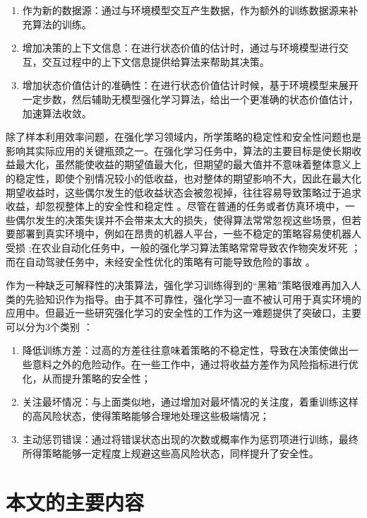 \begin{enumerate}
    \item 作为新的数据源：通过与环境模型交互产生数据，作为额外的训练数据源来补充算法的训练。
    \item 增加决策的上下文信息：在进行状态价值的估计时，通过与环境模型进行交互，交互过程中的上下文信息提供给算法来帮助其决策。
    \item 增加状态价值估计的准确性：在进行状态价值估计时候，基于环境模型来展开一定步数，然后辅助无模型强化学习算法，给出一个更准确的状态价值估计，加速算法收敛。
\end{enumerate}

除了样本利用效率问题，在强化学习领域内，所学策略的稳定性和安全性问题也是影响其实际应用的关键瓶颈之一\cite{junges2016safety}。在强化学习任务中，算法的主要目标是使长期收益最大化，虽然能使收益的期望值最大化，但期望的最大值并不意味着整体意义上的稳定性，即使个别情况较小的低收益，也对整体的期望影响不大，因此在最大化期望收益时，这些偶尔发生的低收益状态会被忽视掉，往往容易导致策略过于追求收益，却忽视整体上的安全性和稳定性 \cite{garcia2015comprehensive}。尽管在普通的任务或者仿真环境中，一些偶尔发生的决策失误并不会带来太大的损失，使得算法常常忽视这些场景，但若要部署到真实环境中，例如在昂贵的机器人平台，一些不稳定的策略容易使机器人受损 \cite{kormushev2010robot};在农业自动化任务中，一般的强化学习算法策略常常导致农作物突发坏死 \cite{bu2019smart}；而在自动驾驶任务中，未经安全性优化的策略有可能导致危险的事故 \cite{sallab2017deep}。

作为一种缺乏可解释性的决策算法，强化学习训练得到的“黑箱”策略很难再加入人类的先验知识作为指导。由于其不可靠性，强化学习一直不被认可用于真实环境的应用中。但最近一些研究强化学习的安全性的工作为这一难题提供了突破口，主要可以分为3个类别 \cite{munos2016safe}：

\begin{enumerate}
    \item 降低训练方差：过高的方差往往意味着策略的不稳定性，导致在决策使做出一些意料之外的危险动作。在一些工作中，通过将收益方差作为风险指标进行优化，从而提升策略的安全性；
    \item 关注最坏情况：与上面类似地，通过增加对最坏情况的关注度，着重训练这样的高风险状态，使得策略能够合理地处理这些极端情况；
    \item 主动惩罚错误：通过将错误状态出现的次数或概率作为惩罚项进行训练，最终所得策略能够一定程度上规避这些高风险状态，同样提升了安全性。
\end{enumerate}

\section{本文的主要内容}

